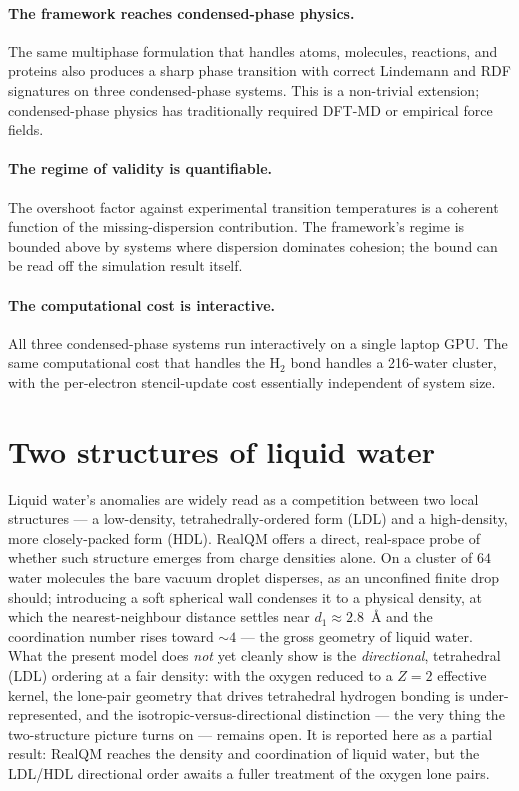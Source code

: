 \paragraph{The framework reaches condensed-phase physics.}
The same multiphase formulation that handles atoms, molecules, reactions, and proteins also produces a sharp phase transition with correct Lindemann and RDF signatures on three condensed-phase systems. This is a non-trivial extension; condensed-phase physics has traditionally required DFT-MD or empirical force fields.

\paragraph{The regime of validity is quantifiable.}
The overshoot factor against experimental transition temperatures is a coherent function of the missing-dispersion contribution. The framework's regime is bounded above by systems where dispersion dominates cohesion; the bound can be read off the simulation result itself.

\paragraph{The computational cost is interactive.}
All three condensed-phase systems run interactively on a single laptop GPU. The same computational cost that handles the H$_2$ bond handles a 216-water cluster, with the per-electron stencil-update cost essentially independent of system size.

\section{Two structures of liquid water}\label{sec:water-two}

Liquid water's anomalies are widely read as a competition between two local structures --- a low-density,
tetrahedrally-ordered form (LDL) and a high-density, more closely-packed form (HDL). RealQM offers a direct,
real-space probe of whether such structure emerges from charge densities alone. On a cluster of $64$ water
molecules the bare vacuum droplet disperses, as an unconfined finite drop should; introducing a soft spherical
wall condenses it to a physical density, at which the nearest-neighbour distance settles near
$d_1\approx 2.8$~\AA{} and the coordination number rises toward $\sim 4$ --- the gross geometry of liquid water.
What the present model does \emph{not} yet cleanly show is the \emph{directional}, tetrahedral (LDL) ordering at
a fair density: with the oxygen reduced to a $Z=2$ effective kernel, the lone-pair geometry that drives
tetrahedral hydrogen bonding is under-represented, and the isotropic-versus-directional distinction --- the very
thing the two-structure picture turns on --- remains open. It is reported here as a partial result: RealQM
reaches the density and coordination of liquid water, but the LDL/HDL directional order awaits a fuller treatment
of the oxygen lone pairs.

